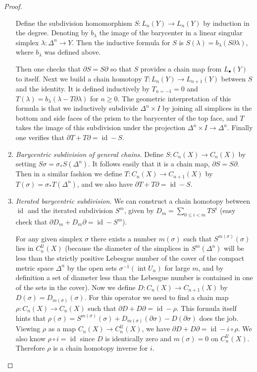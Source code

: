 \documentclass[english,letterpaper]{article}%
\numberwithin{equation}{section}
\numberwithin{figure}{section}
\numberwithin{table}{section}
\theoremstyle{definition}
\theoremstyle{definition}
\theoremstyle{definition}
\theoremstyle{plain}
\theoremstyle{plain}
\theoremstyle{plain}
\theoremstyle{plain}
\theoremstyle{remark}
\theoremstyle{remark}
\newcommand{\calU}{\mathcal{U}}
\renewcommand{\geq}{\geqslant}
\renewcommand{\leq}{\leqslant}
\DeclareMathOperator{\id}{id}
\DeclareMathOperator{\Int}{int}
\begin{document}
\begin{proof}
\begin{enumerate}
         Define the subdivision homomorphism $S:L_n(Y)\to L_n(Y)$ by induction in the degree. Denoting by $b_\lambda$ the image of the barycenter in a linear singular simplex $\lambda:\Delta^n\to Y$. Then the inductive formula for $S$ is $S(\lambda)=b_\lambda(S\partial\lambda)$, where $b_\lambda$ was defined above.
         
         Then one checks that $\partial S=S\partial$ so that $S$ provides a chain map from $L_\bullet(Y)$ to itself. Next we build a chain homotopy $T:L_n(Y)\to L_{n+1}(Y)$ between $S$ and the identity. It is defined inductively by $T_{n=-1}=0$ and $T(\lambda)=b_\lambda(\lambda-T\partial\lambda)$ for $n\geq 0$. The geometric interpretation of this formula is that we inductively subdivide $\Delta^n\times I$ by joining all simplices in the bottom and side faces of the prism to the barycenter of the top face, and $T$ takes the image of this subdivision under the projection $\Delta^n\times I\to \Delta^n$. Finally one verifies that $\partial T+T\partial=\id-S$.
         
         \item \emph{Barycentric subdivision of general chains.} Define $S:C_n(X)\to C_n(X)$ by setting $S\sigma=\sigma_\ast S(\Delta^n)$. It follows easily that it is a chain map, $\partial S=S\partial$. Then in a similar fashion we define $T:C_n(X)\to C_{n+1}(X)$ by $T(\sigma)=\sigma_\ast T(\Delta^n)$, and we also have $\partial T+T\partial =\id -S$.
         
         \item \emph{Iterated barycentric subdivision.} We can construct a chain homotopy between $\id$ and the iterated subdivision $S^m$, given by $D_m=\sum _{0\leq i<m}TS^i$ (easy check that $\partial D_m+D_m\partial=\id -S^m$). 
         
         For any given simplex $\sigma$ there exists a number $m(\sigma)$ such that $S^{m(\sigma)}(\sigma)$ lies in $C^\calU_n(X)$ (because the diameter of the simplices in $S^m(\Delta^n)$ will be less than the strictly positive Lebesgue number of the cover of the compact metric space $\Delta^n$ by the open sets $\sigma^{-1}(\Int U_\alpha)$ for large $m$, and by definition a set of diameter less than the Lebesgue number is contained in one of the sets in the cover). Now we define $D:C_n(X)\to C_{n+1}(X)$ by  $D(\sigma)=D_{m(\sigma)}(\sigma)$. For this operator we need to find a chain map $\rho:C_n(X)\to C_n(X)$ such that $\partial D+D\partial=\id-\rho$. This formula itself hints that $\rho(\sigma)=S^{m(\sigma)}(\sigma)+D_{m(\sigma)}(\partial\sigma)-D(\partial\sigma)$ does the job. Viewing $\rho$ as a map $C_n(X)\to C_n^\calU(X)$, we have $\partial D+D\partial=\id-i\circ\rho$. We also know $\rho\circ i=\id$ since $D$ is identically zero and $m(\sigma)=0$ on $C_n^\calU(X)$. Therefore $\rho$ is a chain homotopy inverse for $i$.
     \end{enumerate}
\end{proof}
\end{document}
